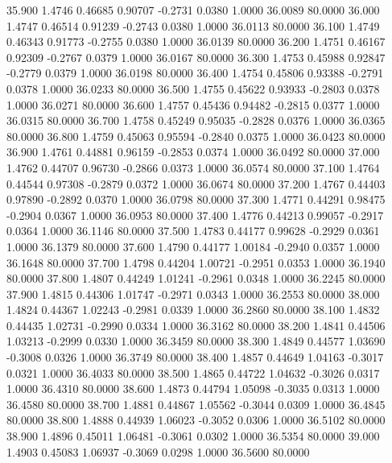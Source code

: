   35.900   1.4746   0.46685   0.90707  -0.2731   0.0380   1.0000  36.0089  80.0000
  36.000   1.4747   0.46514   0.91239  -0.2743   0.0380   1.0000  36.0113  80.0000
  36.100   1.4749   0.46343   0.91773  -0.2755   0.0380   1.0000  36.0139  80.0000
  36.200   1.4751   0.46167   0.92309  -0.2767   0.0379   1.0000  36.0167  80.0000
  36.300   1.4753   0.45988   0.92847  -0.2779   0.0379   1.0000  36.0198  80.0000
  36.400   1.4754   0.45806   0.93388  -0.2791   0.0378   1.0000  36.0233  80.0000
  36.500   1.4755   0.45622   0.93933  -0.2803   0.0378   1.0000  36.0271  80.0000
  36.600   1.4757   0.45436   0.94482  -0.2815   0.0377   1.0000  36.0315  80.0000
  36.700   1.4758   0.45249   0.95035  -0.2828   0.0376   1.0000  36.0365  80.0000
  36.800   1.4759   0.45063   0.95594  -0.2840   0.0375   1.0000  36.0423  80.0000
  36.900   1.4761   0.44881   0.96159  -0.2853   0.0374   1.0000  36.0492  80.0000
  37.000   1.4762   0.44707   0.96730  -0.2866   0.0373   1.0000  36.0574  80.0000
  37.100   1.4764   0.44544   0.97308  -0.2879   0.0372   1.0000  36.0674  80.0000
  37.200   1.4767   0.44403   0.97890  -0.2892   0.0370   1.0000  36.0798  80.0000
  37.300   1.4771   0.44291   0.98475  -0.2904   0.0367   1.0000  36.0953  80.0000
  37.400   1.4776   0.44213   0.99057  -0.2917   0.0364   1.0000  36.1146  80.0000
  37.500   1.4783   0.44177   0.99628  -0.2929   0.0361   1.0000  36.1379  80.0000
  37.600   1.4790   0.44177   1.00184  -0.2940   0.0357   1.0000  36.1648  80.0000
  37.700   1.4798   0.44204   1.00721  -0.2951   0.0353   1.0000  36.1940  80.0000
  37.800   1.4807   0.44249   1.01241  -0.2961   0.0348   1.0000  36.2245  80.0000
  37.900   1.4815   0.44306   1.01747  -0.2971   0.0343   1.0000  36.2553  80.0000
  38.000   1.4824   0.44367   1.02243  -0.2981   0.0339   1.0000  36.2860  80.0000
  38.100   1.4832   0.44435   1.02731  -0.2990   0.0334   1.0000  36.3162  80.0000
  38.200   1.4841   0.44506   1.03213  -0.2999   0.0330   1.0000  36.3459  80.0000
  38.300   1.4849   0.44577   1.03690  -0.3008   0.0326   1.0000  36.3749  80.0000
  38.400   1.4857   0.44649   1.04163  -0.3017   0.0321   1.0000  36.4033  80.0000
  38.500   1.4865   0.44722   1.04632  -0.3026   0.0317   1.0000  36.4310  80.0000
  38.600   1.4873   0.44794   1.05098  -0.3035   0.0313   1.0000  36.4580  80.0000
  38.700   1.4881   0.44867   1.05562  -0.3044   0.0309   1.0000  36.4845  80.0000
  38.800   1.4888   0.44939   1.06023  -0.3052   0.0306   1.0000  36.5102  80.0000
  38.900   1.4896   0.45011   1.06481  -0.3061   0.0302   1.0000  36.5354  80.0000
  39.000   1.4903   0.45083   1.06937  -0.3069   0.0298   1.0000  36.5600  80.0000
